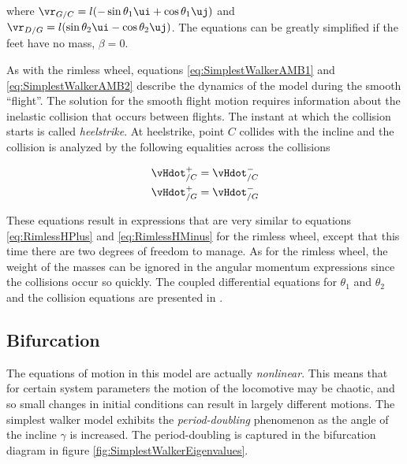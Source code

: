 
where $\vr_{G/C} = l (- \sin{\theta_{1}} \ui +\cos{\theta_{1}} \uj)$ and
$\vr_{D/G} = l (\sin{\theta_{2}} \ui - \cos{\theta_{2}} \uj)$. The equations
can be greatly simplified if the feet have no mass, $\beta = 0$.


As with the rimless wheel, equations \ref{eq:SimplestWalkerAMB1} and
\ref{eq:SimplestWalkerAMB2} describe the dynamics of the model during the
smooth ``flight''. The solution for the smooth flight motion requires
information about the inelastic collision that occurs between flights. The
instant at which the collision starts is called
\textit{heelstrike}. At heelstrike, point $C$ collides with
the incline and the collision is analyzed by the following equalities across
the collisions

\begin{align}
\vHdot_{/C}^{+} &= \vHdot_{/C}^{-} \notag \\
\vHdot_{/G}^{+} &= \vHdot_{/G}^{-} \notag
\label{eq:SimplestWalkerCollision}
\end{align}

These equations result in expressions that are very similar to equations
\ref{eq:RimlessHPlus} and \ref{eq:RimlessHMinus} for the rimless wheel, except
that this time there are two degrees of freedom to manage. As for the rimless
wheel, the weight of the masses can be ignored in the angular momentum
expressions since the collisions occur so quickly. The coupled differential
equations for $\theta_{1}$ and $\theta_{2}$ and the collision equations are
presented in \cite{garcia97}. 

\subsection*{Bifurcation}
\label{sec:SimplestWalkerBifurcation}

The equations of motion in this model are actually
\emph{nonlinear}. This means that for certain system
parameters the motion of the locomotive may be chaotic, and so small changes in
initial conditions can result in largely different motions. The simplest walker
model exhibits the \emph{period-doubling} phenomenon as
the angle of the incline $\gamma$ is increased. The period-doubling is captured
in the bifurcation diagram in figure
\ref{fig:SimplestWalkerEigenvalues}.

